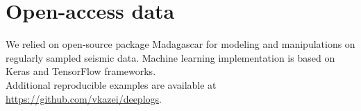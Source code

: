 \documentclass[paper,twocolomn]{geophysics}
\begin{document}






\section{Open-access data}
\vspace*{-0.5\baselineskip}
We relied on open-source package Madagascar \citep{madagascar} for modeling and manipulations on regularly sampled seismic data.
Machine learning implementation is based on Keras \citep{chollet2015keras} and TensorFlow \citep{tensorflow2015-whitepaper} frameworks.
\\
Additional reproducible examples are available at
\href{https://github.com/vkazei/deeplogs}{https://github.com/vkazei/deeplogs}.
\end{document}
